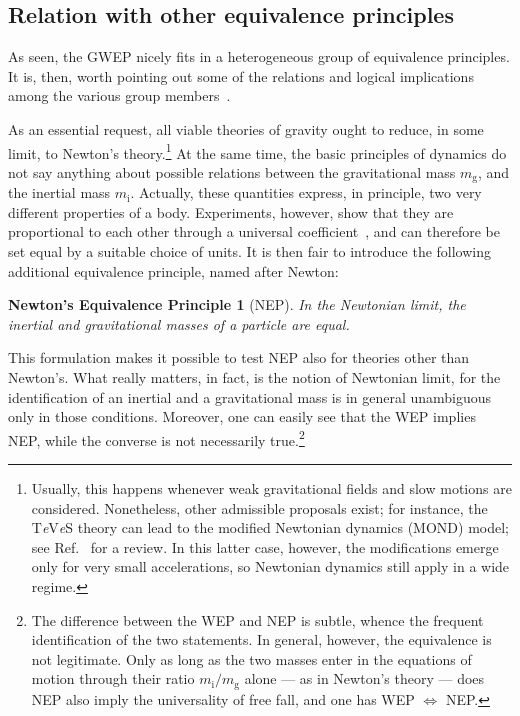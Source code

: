 \documentclass[a4paper,showkeys,aps,prd,reprint,nofootinbib,showpacs,twocolumn]{revtex4-1}
\newcommand{\eq}[1]{\( #1 \)}
\theoremstyle{plain}
\newtheorem*{NEP}{Newton's Equivalence Principle}
\begin{document}
\subsection{Relation with other equivalence principles}
\label{Ss:NEP}

As seen, the GWEP nicely fits in a heterogeneous group of equivalence principles.  It is, then, worth pointing out some of the relations and logical implications among the various group members~\cite{ess1}.

As an essential request, all viable theories of gravity ought to reduce, in some limit, to Newton's theory.\footnote{Usually, this happens whenever weak gravitational fields and slow motions are considered. Nonetheless, other admissible proposals exist; for instance, the T\emph{\!e}V\emph{\!e}S theory can lead to the modified Newtonian dynamics (MOND) model; see Ref.~\cite{TeVeS} for a review.  In this latter case, however, the modifications emerge only for very small accelerations, so Newtonian dynamics still apply in a wide regime.}  At the same time, the basic principles of dynamics do not say anything about possible relations between the gravitational mass \eq{m_{\text{g}}}, and the inertial mass \eq{m_{\text{i}}}. Actually, these quantities express, in principle, two very different properties of a body.  Experiments, however, show that they are proportional to each other through a universal coefficient~\cite{will, will2006lr}, and can therefore be set equal by a suitable choice of units.  It is then fair to introduce the following additional equivalence principle, named after Newton:
%
\begin{NEP}[NEP] In the Newtonian limit, the inertial and gravitational masses of a particle are equal. \end{NEP}
%
This formulation makes it possible to test NEP also for theories other than Newton's. What really matters, in fact, is the notion of Newtonian limit, for the identification of an inertial and a gravitational mass is in general unambiguous only in those conditions.  Moreover, one can easily see that the WEP implies NEP, while the converse is not necessarily true.\footnote{The difference between the WEP and NEP is subtle, whence the frequent identification of the two statements. In general, however, the equivalence is not legitimate.  Only as long as the two masses enter in the equations of motion through their ratio \eq{m_{\text{i}} / m_{\text{g}}} alone --- as in Newton's theory --- does NEP also imply the universality of free fall, and one has WEP \eq{\Leftrightarrow} NEP.}
\end{document}
